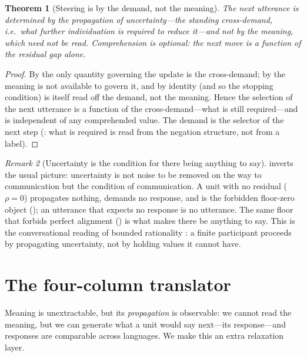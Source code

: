 \documentclass[twocolumn,11pt,a4paper]{article}
\theoremstyle{sup}
\newtheorem{theorem}{Theorem}[section]
\theoremstyle{definition}
\theoremstyle{remark}
\newtheorem{remark}[theorem]{Remark}
\newcommand{\res}{\rho}
\begin{document}
\begin{theorem}[Steering is by the demand, not the meaning]
\label{thm:steer}
The next utterance is determined by the propagation of uncertainty---the standing
cross-demand, i.e.\ what further individuation is required to reduce
it---and not by the meaning, which need not be read. Comprehension is optional:
the next move is a function of the residual gap alone.
\end{theorem}

\begin{proof}
By  the only quantity governing the update is the cross-demand;
by  the meaning is not available to govern it, and by
 identity (and so the stopping condition) is itself read off
the demand, not the meaning. Hence the selection of the next utterance is a
function of the cross-demand---what is still required---and is independent of any
comprehended value. The demand is the selector of the next step
(: what is required is read from the negation structure,
not from a label).
\end{proof}

\begin{remark}[Uncertainty is the condition for there being anything to say]
\label{rem:condition}
 inverts the usual picture: uncertainty is not noise to be
removed on the way to communication but the condition of communication. A unit
with no residual ($\res=0$) propagates nothing, demands no response, and is the
forbidden floor-zero object (); an utterance that expects no
response is no utterance. The same floor that forbids perfect alignment
() is what makes there be anything to say. This is the
conversational reading of bounded rationality \citep{simon1955}: a finite
participant proceeds by propagating uncertainty, not by holding values it cannot
have.
\end{remark}

\section{The four-column translator}
\label{sec:four}

Meaning is unextractable, but its \emph{propagation} is observable: we cannot
read the meaning, but we can generate what a unit would say next---its
response---and responses are comparable across languages. We make this an extra
relaxation layer.
\end{document}
